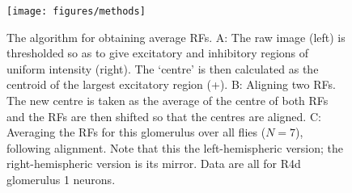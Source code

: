 \begin{figure}
\centering
\texttt{[image: figures/methods]}
\caption{The algorithm for obtaining average RFs.
A: The raw image (left) is thresholded so as to give excitatory and inhibitory regions of uniform intensity (right).
The `centre' is then calculated as the centroid of the largest excitatory region (+).
B: Aligning two RFs.
The new centre is taken as the average of the centre of both RFs and the RFs are then shifted so that the centres are aligned.
C: Averaging the RFs for this glomerulus over all flies ($N=7$), following alignment.
Note that this the left-hemispheric version; the right-hemispheric version is its mirror.
Data are all for R4d glomerulus 1 neurons.}
\label{fig:avkernels}
\end{figure}
